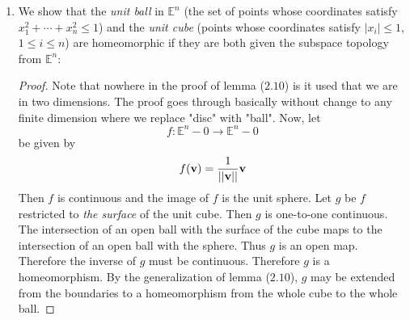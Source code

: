 \documentclass{book}
\begin{document}
\begin{enumerate}[(1)]
    \item We show that the {\it unit ball}\/ in $\mathbb E^n$ (the set of points whose coordinates satisfy $x_1^2+\cdots+x_n^2\leq1$) and the {\it unit cube} (points whose coordinates satisfy $|x_i|\leq1$, $1\leq i\leq n$) are homeomorphic if they are both given the subspace topology from $\mathbb E^n$: 
        \begin{proof} Note that nowhere in the proof of lemma ($2.10$) is it used that we are in two dimensions.  The proof goes through basically without change to any finite dimension where we replace "disc" with "ball".
            Now, let 
            \[f:\mathbb E^n-{0}\rightarrow\mathbb E^n-{0}\]
            be given by 
            \[f({\bf v})=\frac{1}{||{\bf v}||}{\bf v}\]
            Then $f$ is continuous and the image of $f$ is the unit sphere.  Let $g$ be $f$ restricted to {\it the surface} of the unit cube.  Then $g$ is one-to-one continuous.  The intersection of an open ball with the surface of the cube maps to the intersection of an open ball with the sphere.  Thus $g$ is an open map.  Therefore the inverse of $g$ must be continuous. Therefore $g$ is a homeomorphism.  By the generalization of lemma ($2.10$), $g$ may be extended from the boundaries to a homeomorphism from the whole cube to the whole ball.
        \end{proof}

\end{enumerate}
\end{document}
